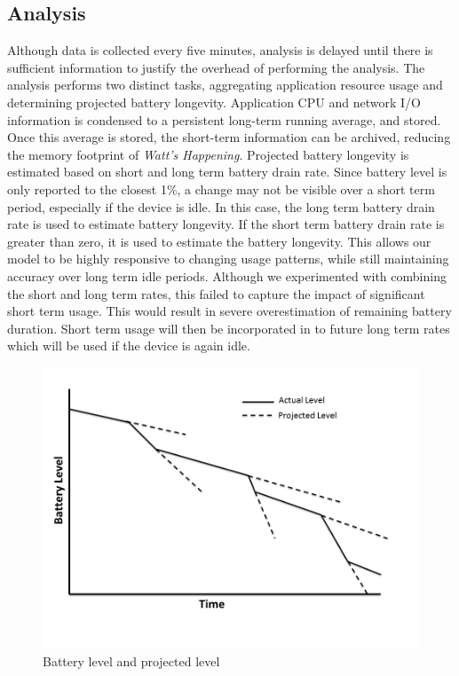 \subsection*{Analysis}
Although data is collected every five minutes, analysis is delayed until there is sufficient information to justify the overhead of performing the analysis.
The analysis performs two distinct tasks, aggregating application resource usage and determining projected battery longevity.
Application CPU and network I/O information is condensed to a persistent long-term running average, and stored.
Once this average is stored, the short-term information can be archived, reducing the memory footprint of \emph{Watt's Happening}.
Projected battery longevity is estimated based on short and long term battery drain rate.
Since battery level is only reported to the closest 1\%, a change may not be visible over a short term period, especially if the device is idle.
In this case, the long term battery drain rate is used to estimate battery longevity.  
If the short term battery drain rate is greater than zero, it is used to estimate the battery longevity.
This allows our model to be highly responsive to changing usage patterns, while still maintaining accuracy over long term idle periods.
Although we experimented with combining the short and long term rates, this failed to capture the impact of significant short term usage.  
This would result in severe overestimation of remaining battery duration.
Short term usage will then be incorporated in to future long term rates which will be used if the device is again idle.
\begin{figure}[ht!]
	\begin{center}
		\includegraphics[width=\columnwidth]{figs/bat_vs_time.png}
		\caption{Battery level and projected level}
		\label{fig:bat_v_time}
\end{center}
\end{figure}
